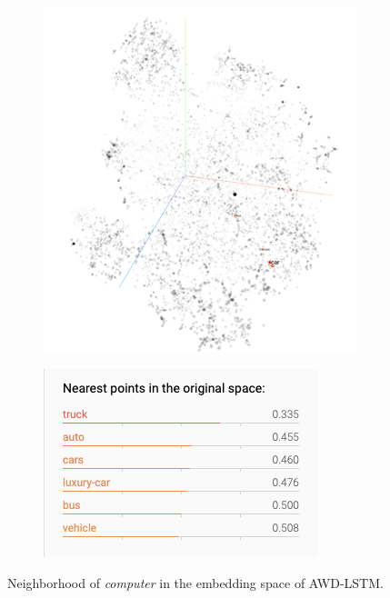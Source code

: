 \begin{figure}
\centering
\begin{subfigure}{.5\textwidth}
  \centering
  \includegraphics[width=\linewidth]{figures/car_emb_neighbor.png}
  \label{computer:neighborhood}
\end{subfigure}%
\begin{subfigure}{.5\textwidth}
  \centering
  \includegraphics[width=\linewidth]{figures/car_nearest_neighbors.png}
  \label{computer:neighbor}
\end{subfigure}
\caption{Neighborhood of \emph{computer} in the embedding space of AWD-LSTM.}
\label{computer}
\end{figure}

